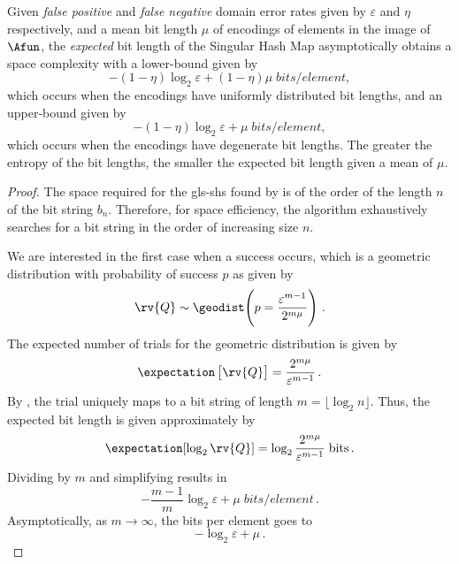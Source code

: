 \documentclass{article}
\begin{document}
\begin{theorem}
Given \emph{false positive} and \emph{false negative} domain error rates given by $\varepsilon$ and $\eta$ respectively, and a mean bit length $\mu$ of encodings of elements in the image of $\Afun$, the \emph{expected} bit length of the Singular Hash Map asymptotically obtains a space complexity with a lower-bound given by
\begin{equation}
    -(1 - \eta) \log_2 \varepsilon + (1 - \eta) \mu \; \si{bits \per element},
\end{equation}
which occurs when the encodings have uniformly distributed bit lengths, and an upper-bound given by
\begin{equation}
    -(1 - \eta) \log_2 \varepsilon + \mu \; \si{bits \per element},
\end{equation}
which occurs when the encodings have degenerate bit lengths. The greater the entropy of the bit lengths, the smaller the expected bit length given a mean of $\mu$. 
\end{theorem}
\begin{proof}
The space required for the \gls{gls-shs} found by  is of the order of the length $n$ of the bit string $b_n$. Therefore, for space efficiency, the algorithm exhaustively searches for a bit string in the order of increasing size $n$.

We are interested in the first case when a success occurs, which is a geometric distribution with probability of success $p$ as given by
\begin{equation}
    \rv{Q} \sim \geodist\!\left(p = \frac{\varepsilon^{m-1}}{2^{m \mu}}\right)\,.
\end{equation}
The expected number of trials for the geometric distribution is given by
\begin{equation}
\label{eq:exp_trials}
    \expectation\left[\rv{Q}\right] = \frac{2^{m \mu}}{\varepsilon^{m-1}}\,.
\end{equation}
By , the \nth trial uniquely maps to a bit string of length $m = \lfloor \log_2 n \rfloor$. Thus, the expected bit length is given approximately by
\begin{equation}
    \expectation[\log_2 \rv{Q}] = \log_2 \frac{2^{m \mu}}{\varepsilon^{m-1}}\; \si{bits}\,.
\end{equation}
Dividing by $m$ and simplifying results in
\begin{equation}
    -\frac{m-1}{m} \log_2 \varepsilon + \mu\; \si{bits \per element}\,.
\end{equation}
Asymptotically, as $m \to \infty$, the bits per element goes to
\begin{equation}
    -\log_2 \varepsilon + \mu\,.
\end{equation}
\end{proof}
\end{document}
